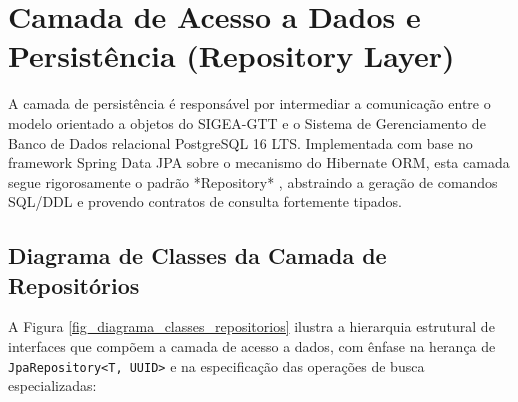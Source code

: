 \chapter{Camada de Acesso a Dados e Persistência (Repository Layer)}
\label{cap_camada_persistencia}

A camada de persistência é responsável por intermediar a comunicação entre o modelo orientado a objetos do SIGEA-GTT e o Sistema de Gerenciamento de Banco de Dados relacional PostgreSQL 16 LTS. Implementada com base no framework Spring Data JPA sobre o mecanismo do Hibernate ORM, esta camada segue rigorosamente o padrão *Repository* \cite{fowler2002}, abstraindo a geração de comandos SQL/DDL e provendo contratos de consulta fortemente tipados.

\section{Diagrama de Classes da Camada de Repositórios}
\label{sec_diagrama_classes_repositorios}

A Figura \ref{fig_diagrama_classes_repositorios} ilustra a hierarquia estrutural de interfaces que compõem a camada de acesso a dados, com ênfase na herança de \texttt{JpaRepository<T, UUID>} e na especificação das operações de busca especializadas:


